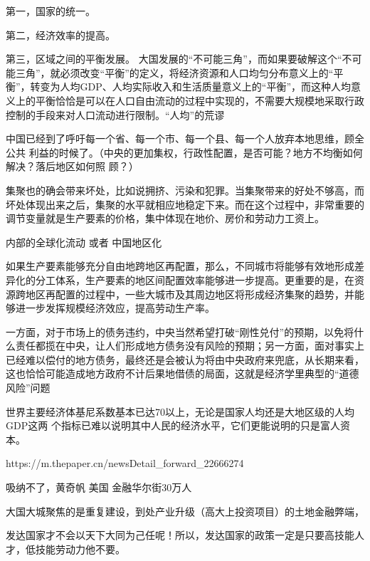 第一，国家的统一。

第二，经济效率的提高。

第三，区域之间的平衡发展。
大国发展的“不可能三角”，而如果要破解这个“不可能三角”，就必须改变“平衡”的定义，将经济资源和人口均匀分布意义上的“平衡”，转变为人均GDP、人均实际收入和生活质量意义上的“平衡”，而这种人均意义上的平衡恰恰是可以在人口自由流动的过程中实现的，不需要大规模地采取行政控制的手段来对人口流动进行限制。“人均”的荒谬





中国已经到了呼吁每一个省、每一个市、每一个县、每一个人放弃本地思维，顾全公共
利益的时候了。（中央的更加集权，行政性配置，是否可能？地方不均衡如何解决？落后地区如何照
顾？）

集聚也的确会带来坏处，比如说拥挤、污染和犯罪。当集聚带来的好处不够高，而坏处体现出来之后，集聚的水平就相应地稳定下来。而在这个过程中，非常重要的调节变量就是生产要素的价格，集中体现在地价、房价和劳动力工资上。


内部的全球化流动 或者 中国地区化

如果生产要素能够充分自由地跨地区再配置，那么，不同城市将能够有效地形成差异化的分工体系，生产要素的地区间配置效率能够进一步提高。更重要的是，在资源跨地区再配置的过程中，一些大城市及其周边地区将形成经济集聚的趋势，并能够进一步发挥规模经济效应，提高劳动生产率。

一方面，对于市场上的债务违约，中央当然希望打破“刚性兑付”的预期，以免将什么责任都揽在中央，让人们形成地方债务没有风险的预期；另一方面，面对事实上已经难以偿付的地方债务，最终还是会被认为将由中央政府来兜底，从长期来看，这也恰恰可能造成地方政府不计后果地借债的局面，这就是经济学里典型的“道德风险”问题


世界主要经济体基尼系数基本已达70以上，无论是国家人均还是大地区级的人均GDP这两
个指标已难以说明其中人民的经济水平，它们更能说明的只是富人资本。

https://m.thepaper.cn/newsDetail_forward_22666274

吸纳不了，黄奇帆 美国 金融华尔街30万人

大国大城聚焦的是重复建设，到处产业升级（高大上投资项目）的土地金融弊端，

发达国家才不会以天下大同为己任呢！所以，发达国家的政策一定是只要高技能人才，低技能劳动力他不要。
